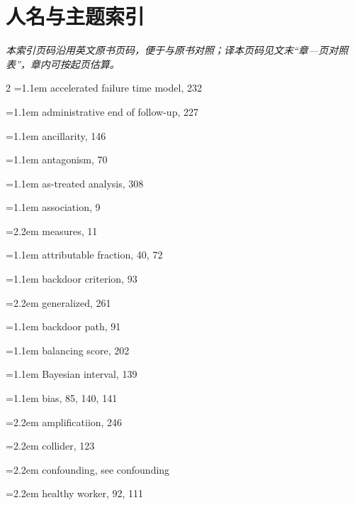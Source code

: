 \chapter*{人名与主题索引}
\thispagestyle{plain}
\begin{center}\small\itshape 本索引页码沿用英文原书页码，便于与原书对照；译本页码见文末“章—页对照表”，章内可按起页估算。\end{center}
\begingroup\small\raggedright
\begin{multicols}{2}
\setlength{\parindent}{0pt}\setlength{\parskip}{1.1pt}
\hangindent=1.1em accelerated failure time model, 232\par
\hangindent=1.1em administrative end of follow-up, 227\par
\hangindent=1.1em ancillarity, 146\par
\hangindent=1.1em antagonism, 70\par
\hangindent=1.1em as-treated analysis, 308\par
\hangindent=1.1em association, 9\par
\hspace*{1.1em}\hangindent=2.2em measures, 11\par
\hangindent=1.1em attributable fraction, 40, 72\par
\hangindent=1.1em backdoor criterion, 93\par
\hspace*{1.1em}\hangindent=2.2em generalized, 261\par
\hangindent=1.1em backdoor path, 91\par
\hangindent=1.1em balancing score, 202\par
\hangindent=1.1em Bayesian interval, 139\par
\hangindent=1.1em bias, 85, 140, 141\par
\hspace*{1.1em}\hangindent=2.2em amplificatiion, 246\par
\hspace*{1.1em}\hangindent=2.2em collider, 123\par
\hspace*{1.1em}\hangindent=2.2em confounding, see confounding\par
\hspace*{1.1em}\hangindent=2.2em healthy worker, 92, 111\par

\end{multicols}
